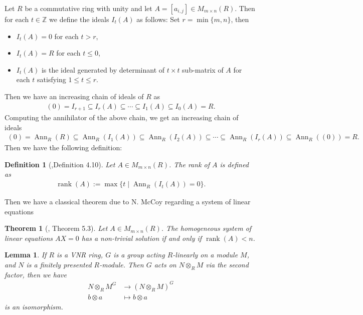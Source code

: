 \documentclass{amsart}
\newtheorem{lemma}[proposition]{Lemma}
\newtheorem{definition}[proposition]{Definition}
\newtheorem{theorem}[proposition]{Theorem}
\DeclareMathOperator{\Ann}{Ann}
\DeclareMathOperator{\rank}{rank}
\begin{document}
Let $R$ be a commutative ring with unity and let $A=[a_{i,j}]\in M_{m\times n}(R)$. Then for each $t\in\mathbb{Z}$ we define the ideals $I_t(A)$ as follows: Set $r=\min\{m,n\}$, then 
\begin{itemize}
    \item $I_t(A)=0$ for each $t>r$,
    \item $I_t(A)=R$ for each $t\leq 0$,
    \item $I_t(A)$ is the ideal generated by determinant of $t\times t$ sub-matrix of $A$ for each $t$ satisfying $1\leq t\leq r$.
\end{itemize}
Then we have an increasing chain of ideals of $R$ as
\begin{align*}
    (0)=I_{r+1}\subseteq I_r(A)\subseteq \cdots\subseteq I_1(A)\subseteq I_0(A)=R.
\end{align*}
Computing the annihilator of the above chain, we get an increasing chain of ideals
\begin{align*}
    (0)=\Ann_R(R)\subseteq\Ann_R(I_1(A))\subseteq\Ann_R(I_2(A))\subseteq\cdots\subseteq\Ann_R(I_r(A))\subseteq\Ann_R((0))=R.
\end{align*}
Then we have the following definition:

\begin{definition}[\cite{William},Definition 4.10]
    Let $A\in M_{m\times n}(R)$. The \emph{rank} of $A$ is defined as
    \begin{align*}
        \rank(A):=\max\{t\mid \Ann_R(I_t(A))=0\}.
    \end{align*}
\end{definition}

Then we have a classical theorem due to N. McCoy regarding a system of linear equations
\begin{theorem}[\cite{William}, Theorem 5.3]\label{solution of homogeneous systems}
    Let $A\in M_{m\times n}(R)$. The homogeneous system of linear equations $AX=0$ has a non-trivial solution if and only if $\rank(A)<n$.
\end{theorem}

\begin{lemma}\label{fixed point lemma}
    If $R$ is a VNR ring, $G$ is a group acting $R$-linearly on a module $M$, and $N$ is a finitely presented $R$-module. Then $G$ acts on $N\otimes_R M$ via the second factor, then we have
    \begin{align*}
        N\otimes_R M^G&\to (N\otimes_R M)^G\\
          b\otimes a  &\mapsto b\otimes a
    \end{align*}
    is an isomorphism. 
\end{lemma}
\end{document}

